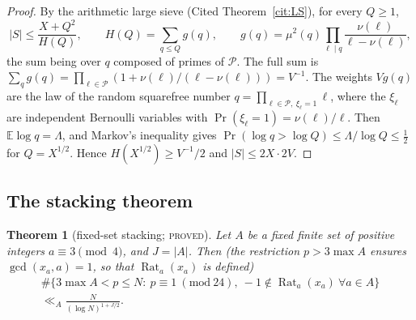 \documentclass[11pt,reqno]{amsart}
\newtheorem{theorem}{Theorem}[section]
\theoremstyle{definition}
\newcommand{\Rat}{\operatorname{Rat}}
\newcommand{\status}[1]{\textup{\textsc{#1}}}
\begin{document}
\begin{proof}
By the arithmetic large sieve (Cited Theorem~\ref{cit:LS}), for every
$Q\ge1$,
\[
 |S|\le\frac{X+Q^2}{H(Q)},\qquad H(Q)=\sum_{q\le Q}g(q),\qquad
 g(q)=\mu^2(q)\prod_{\ell\mid q}\frac{\nu(\ell)}{\ell-\nu(\ell)},
\]
the sum being over $q$ composed of primes of $\mathcal P$.  The full sum is
$\sum_q g(q)=\prod_{\ell\in\mathcal P}(1+\nu(\ell)/(\ell-\nu(\ell)))=V^{-1}$.
The weights $Vg(q)$ are the law of the random squarefree number
$q=\prod_{\ell\in\mathcal P,\ \xi_\ell=1}\ell$, where the $\xi_\ell$ are
independent Bernoulli variables with $\Pr(\xi_\ell=1)=\nu(\ell)/\ell$.  Then
$\mathbb E\log q=\Lambda$, and Markov's inequality gives
$\Pr(\log q>\log Q)\le\Lambda/\log Q\le\frac12$ for $Q=X^{1/2}$.  Hence
$H(X^{1/2})\ge V^{-1}/2$ and $|S|\le 2X\cdot2V$.
\end{proof}

\subsection{The stacking theorem}

\begin{theorem}[fixed-set stacking; \status{proved}]\label{thm:stack}
Let $A$ be a fixed finite set of positive integers $a\equiv3\pmod4$, and
$J=|A|$.  Then (the restriction $p>3\max A$ ensures $\gcd(x_a,a)=1$, so that $\Rat_a(x_a)$ is defined)
\begin{multline*}
 \#\{3\max A<p\le N:\ p\equiv1\ (\mathrm{mod}\ 24),\ -1\notin\Rat_a(x_a)\ \forall a\in A\}\\
 \ll_A\frac{N}{(\log N)^{1+J/2}}.
\end{multline*}
\end{theorem}
\end{document}
